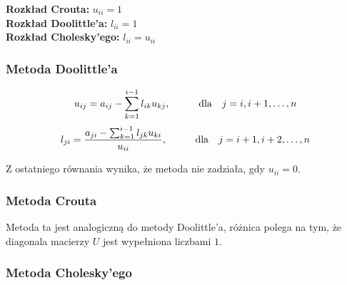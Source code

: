 \documentclass[../mn-notatki.tex]{subfiles}
\begin{document}
\textbf{Rozkład Crouta:} $u_{ii} = 1$\\
\textbf{Rozkład Doolittle'a:} $l_{ii} = 1$\\
\textbf{Rozkład Cholesky'ego:} $l_{ii} = u_{ii}$

\pagebreak

\subsubsection{Metoda Doolittle'a}
\[
u_{ij} = a_{ij} - \sum_{k=1}^{i-1} l_{ik} u_{kj}, \hspace*{1cm} \text{dla ~~} j = i, i+1, \ldots, n
\]
\[
l_{ji} = \frac{ a_{ji} - \sum_{k=1}^{i-1} l_{jk} u_{ki} }{u_{ii}}, \hspace*{1cm} \text{dla ~~} j = i+1, i+2, \ldots, n
\]

Z ostatniego równania wynika, że metoda nie zadziała, gdy
$u_{ii}=0$.

\subsubsection{Metoda Crouta}

Metoda ta jest analogiczną do metody Doolittle’a, różnica polega na tym, że
diagonala macierzy $U$ jest wypełniona liczbami $1$.

\subsubsection{Metoda Cholesky'ego}
\end{document}
